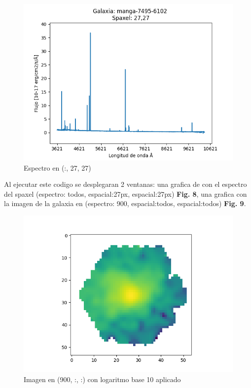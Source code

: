 \documentclass[9pt,twocolumn,a4paper]{opticajnl}
\begin{document}
\begin{figure}
    \centering
    \includegraphics[width=1\linewidth]{espectro1_python.png}
    \caption{Espectro en (:, 27, 27)}
    \label{fig:espectro1_python}
\end{figure}

Al ejecutar este codigo se desplegaran 2 ventanas: una grafica de con el espectro del spaxel {\ttfamily(espectro: todos, espacial:27px, espacial:27px)} \textbf{Fig. 8}, una grafica con la imagen de la galaxia en {\ttfamily(espectro: 900, espacial:todos, espacial:todos)} \textbf{Fig. 9}.


\begin{figure}
    \centering
    \includegraphics[width=1\linewidth]{imagen1_python.png}
    \caption{Imagen en (900, :, :) con logaritmo base 10 aplicado}
    \label{fig:imagen1_python}
\end{figure}
\end{document}
